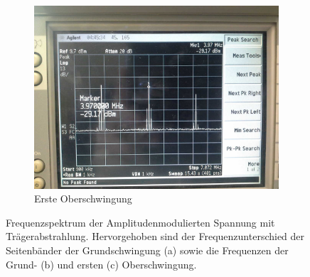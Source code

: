 \begin{figure}[!h]
\begin{subfigure}[t]{0.5\textwidth}
\end{subfigure}%
~
\begin{subfigure}[t]{0.5\textwidth}
	\centering
	\includegraphics[scale=0.17]{../Grafiken/Frequenzspektrum_c_AmpModuliertTraeger_Oberwellen_1.jpg}
	\caption{Erste Oberschwingung\label{fig:frequenzspektrum_c_ampmodulierttraeger_oberwellen_1}}
\end{subfigure}

\caption{Frequenzspektrum der Amplitudenmodulierten Spannung mit Trägerabstrahlung. Hervorgehoben sind
	der Frequenzunterschied der Seitenbänder der Grundschwingung (a) sowie die Frequenzen der Grund- (b)
	und ersten (c) Oberschwingung.   
	\label{fig:frequenzspektrum_c_ampmodulierttraeger}}
\end{figure}
\FloatBarrier


